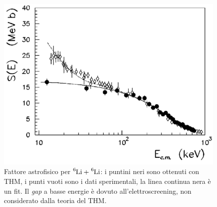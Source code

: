 \begin{enumerate}
	\begin{figure}[!h]
		\centering
		\includegraphics[scale=0.5]{Immagini/0421_Se.png}
		\caption{Fattore astrofisico per $\ce{^6Li} + \ce{^6Li}$: i puntini neri sono ottenuti con THM, i punti vuoti sono i dati sperimentali, la linea continua nera è un fit. Il \textit{gap} a basse energie è dovuto all'elettroscreening, non considerato dalla teoria del THM.}
		\label{0421_Se}
	\end{figure}	
\end{enumerate}
